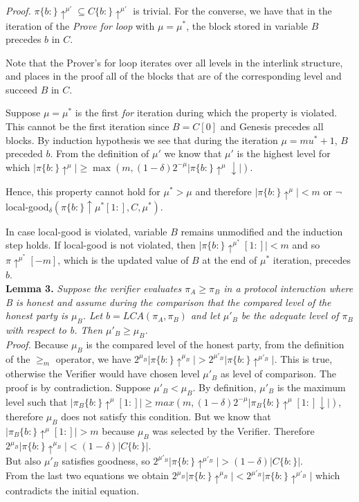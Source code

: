 \textit{Proof.} $ \pi\{b:\}\uparrow^{\mu'} \subseteq C\{b:\}\uparrow^{\mu'}$ is
trivial. For the converse, we have that in the iteration of the \emph{Prove for
loop}\cite{NIPoPoWs} with $\mu = \mu^*$, the block stored in variable $B$
precedes $b$ in $C$.

Note that the Prover's for loop iterates over all levels in the interlink structure,
and places in the proof all of the blocks that are of the corresponding level and succeed $B$ in $C$.

Suppose $\mu = \mu^*$ is the first \emph{for} iteration during which the property
is violated. This cannot be the first iteration since $B = C[0]$ and Genesis
precedes all blocks. By induction hypothesis we see that during the iteration
$\mu = mu^* + 1$, $B$ preceded $b$. From the definition of $\mu'$ we know that
$\mu'$ is the highest level for which $\vert \pi\{b:\}\uparrow^{\mu} \vert
\geq \max( m, (1-\delta)2^{-\mu} \vert \pi\{b:\}\uparrow^{\mu}\downarrow \vert ) $.

Hence, this property cannot hold for $\mu^* > \mu$ and therefore $\vert
\pi\{b:\}\uparrow^{\mu} \vert < m$ or $\neg$local-good$_\delta(\pi\{b:
\}\uparrow \mu^*[1:], C, \mu^*)$.

In case local-good is violated, variable $B$ remains unmodified and the induction
step holds. If local-good is not violated, then $ \vert \pi\{b:\} \uparrow^{\mu^*}[1:]
\vert < m$ and so $\pi\uparrow^{\mu^*}[-m]$, which is the updated value of $B$ at the
end of $\mu^*$ iteration, precedes $b$.\\

\textbf{Lemma 3.} \textit{Suppose the verifier evaluates $\pi_A \geq \pi_B$ in a
protocol interaction where B is honest and assume during the comparison that the
compared level of the honest party is $\mu_B$. Let $b = LCA(\pi_A, \pi_B)$ and
let ${\mu}'_B$ be the adequate level of $\pi_B$ with respect to b. Then ${\mu}'_B
\geq \mu_B$.}\\

\textit{Proof.} Because $\mu_B$ is the compared level of the honest party, from
the definition of the $\geq_m$ operator, we have $2^{\mu_B} \vert \pi\{b:\}\uparrow^{\mu_B}
\vert > 2^{{\mu}'_B} \vert \pi\{b:\}\uparrow^{{\mu}'_B} \vert $. This is true,
otherwise the Verifier would have chosen level $\mu'_B$ as level of comparison.
The proof is by contradiction. Suppose $\mu'_B < \mu_B$.
By definition, $\mu'_B$ is the maximum level such that $\vert \pi_B\{b:\}\uparrow^\mu
[1:] \vert \geq max(m, (1-\delta)2^{-\mu}\vert \pi_B\{b:\}\uparrow^\mu [1:]\downarrow
\vert)$, therefore $\mu_B$ does not satisfy this condition.
But we know that $\vert \pi_B\{b:\}\uparrow^\mu [1:] \vert > m$ because
$\mu_B$ was selected by the Verifier.
Therefore $ 2^{\mu_B} \vert \pi\{b:\}\uparrow^{\mu_B} \vert < (1-\delta)\vert
C\{b:\}\vert $. \\
But also $\mu'_B$ satisfies goodness, so $ 2^{\mu'_B} \vert \pi\{b:\}\uparrow^{\mu'_B}
\vert > (1-\delta)\vert C\{b:\}\vert $.\\ From the last two equations we obtain
$ 2^{\mu_B} \vert \pi\{b:\}\uparrow^{\mu_B} \vert < 2^{\mu'_B} \vert
\pi\{b:\}\uparrow^{\mu'_B} \vert$ which contradicts the initial equation.\\

